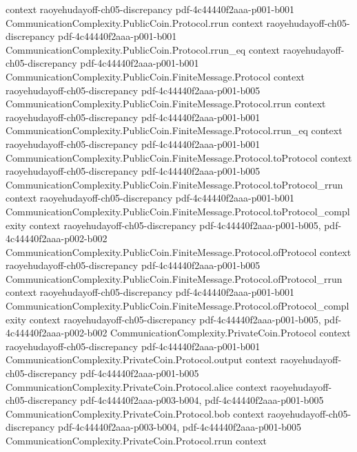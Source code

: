 \begin{lemma}
  {context}
  {raoyehudayoff-ch05-discrepancy}
  {pdf-4c44440f2aaa-p001-b001}
\proofstep
  {CommunicationComplexity.PublicCoin.Protocol.rrun}
  {context}
  {raoyehudayoff-ch05-discrepancy}
  {pdf-4c44440f2aaa-p001-b001}
\proofstep
  {CommunicationComplexity.PublicCoin.Protocol.rrun_eq}
  {context}
  {raoyehudayoff-ch05-discrepancy}
  {pdf-4c44440f2aaa-p001-b001}
\proofstep
  {CommunicationComplexity.PublicCoin.FiniteMessage.Protocol}
  {context}
  {raoyehudayoff-ch05-discrepancy}
  {pdf-4c44440f2aaa-p001-b005}
\proofstep
  {CommunicationComplexity.PublicCoin.FiniteMessage.Protocol.rrun}
  {context}
  {raoyehudayoff-ch05-discrepancy}
  {pdf-4c44440f2aaa-p001-b001}
\proofstep
  {CommunicationComplexity.PublicCoin.FiniteMessage.Protocol.rrun_eq}
  {context}
  {raoyehudayoff-ch05-discrepancy}
  {pdf-4c44440f2aaa-p001-b001}
\proofstep
  {CommunicationComplexity.PublicCoin.FiniteMessage.Protocol.toProtocol}
  {context}
  {raoyehudayoff-ch05-discrepancy}
  {pdf-4c44440f2aaa-p001-b005}
\proofstep
  {CommunicationComplexity.PublicCoin.FiniteMessage.Protocol.toProtocol_rrun}
  {context}
  {raoyehudayoff-ch05-discrepancy}
  {pdf-4c44440f2aaa-p001-b001}
\proofstep
  {CommunicationComplexity.PublicCoin.FiniteMessage.Protocol.toProtocol_complexity}
  {context}
  {raoyehudayoff-ch05-discrepancy}
  {pdf-4c44440f2aaa-p001-b005,
    pdf-4c44440f2aaa-p002-b002}
\proofstep
  {CommunicationComplexity.PublicCoin.FiniteMessage.Protocol.ofProtocol}
  {context}
  {raoyehudayoff-ch05-discrepancy}
  {pdf-4c44440f2aaa-p001-b005}
\proofstep
  {CommunicationComplexity.PublicCoin.FiniteMessage.Protocol.ofProtocol_rrun}
  {context}
  {raoyehudayoff-ch05-discrepancy}
  {pdf-4c44440f2aaa-p001-b001}
\proofstep
  {CommunicationComplexity.PublicCoin.FiniteMessage.Protocol.ofProtocol_complexity}
  {context}
  {raoyehudayoff-ch05-discrepancy}
  {pdf-4c44440f2aaa-p001-b005,
    pdf-4c44440f2aaa-p002-b002}
\proofstep
  {CommunicationComplexity.PrivateCoin.Protocol}
  {context}
  {raoyehudayoff-ch05-discrepancy}
  {pdf-4c44440f2aaa-p001-b001}
\proofstep
  {CommunicationComplexity.PrivateCoin.Protocol.output}
  {context}
  {raoyehudayoff-ch05-discrepancy}
  {pdf-4c44440f2aaa-p001-b005}
\proofstep
  {CommunicationComplexity.PrivateCoin.Protocol.alice}
  {context}
  {raoyehudayoff-ch05-discrepancy}
  {pdf-4c44440f2aaa-p003-b004,
    pdf-4c44440f2aaa-p001-b005}
\proofstep
  {CommunicationComplexity.PrivateCoin.Protocol.bob}
  {context}
  {raoyehudayoff-ch05-discrepancy}
  {pdf-4c44440f2aaa-p003-b004,
    pdf-4c44440f2aaa-p001-b005}
\proofstep
  {CommunicationComplexity.PrivateCoin.Protocol.rrun}
  {context}

\end{lemma}
